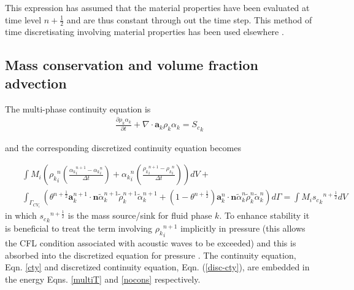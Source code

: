 This expression has assumed that the material properties have been evaluated at time level ${n+{\frac{1}{2}}}$ and are thus constant through out the time step. This method of time discretisating
involving material properties has been used elsewhere \cite{ChrisNSE}.




\subsection{Mass conservation and volume fraction advection}

The multi-phase continuity equation is
\begin{eqnarray}
\frac{\partial \rho_k\alpha_k}{\partial t}
+ \nabla \cdot \mathbf{a}_k \rho_k \alpha_k = {S_c}_k
\label{cty}
\end{eqnarray}

and the corresponding discretized continuity equation becomes

\begin{eqnarray}
&&\int M_{i}  \left( {\rho_k}_{i}^{n}
\left(\displaystyle\frac{{\alpha_k}_{i}^{n+1}-{\alpha_k}_{i}^{n}}{\Delta
t}\right) + {\alpha_k}_{i}^{n}
\left(\displaystyle\frac{{\rho_k}_{i}^{n+1}-{\rho_k}_{i}^{n}}{\Delta
t}\right) \right)dV + \nonumber\\
&&\int_{\Gamma_{CV_{i}}}\left( \theta^{n+\frac{1}{2}}
 \mathbf{a}^{n+1}_k \cdot \mathbf{n}\widetilde{\alpha}_k^{n+1} \widetilde{\rho}_k^{n+1}
\widetilde{\alpha}^{n+1}_k
+
(1-\theta^{n+\frac{1}{2}} )
 \mathbf{a}^{n}_k \cdot \mathbf{n}\widetilde{\alpha}_k^{n} \widetilde{\rho}_k^{n}
\widetilde{\alpha}^{n}_k
  \right) d\Gamma
=
\int M_{i} {{s_c}_k}^{n+\frac{1}{2}} dV
\label{disc-cty}
\end{eqnarray}
in which ${{s_c}_k}^{n+\frac{1}{2}}$ is the mass source/sink for fluid phase $k$. To enhance stability it is beneficial to treat the term involving ${\rho_k}_i^{n+1}$ implicitly in pressure (this allows the CFL condition associated with acoustic waves to be exceeded) and this is absorbed into the discretized equation for pressure \citep[see][for more details]{pain_2001b}.  The continuity equation, Eqn. \ref{cty} and discretized continuity equation, Eqn. (\ref{disc-cty}), are embedded in the energy Eqns. \ref{multiT} and \ref{nocons} respectively.



